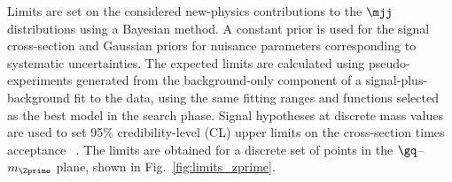Limits are set on the considered new-physics contributions to the $\mjj$ distributions using a Bayesian method. 
A constant prior is used for the signal cross-section and Gaussian priors for nuisance parameters corresponding to systematic uncertainties. 
The expected limits are calculated using pseudo-experiments generated from the background-only component of a signal-plus-background fit to the data, using the same fitting ranges and functions selected as the best model in the search phase.  
Signal hypotheses at discrete mass values are used to set 95\% credibility-level (CL) upper limits on the cross-section times acceptance ~\cite{EXOT-2010-07}.
The limits are obtained for a discrete set of points in the $\gq$--$m_{\Zprime}$ plane, shown in Fig.~\ref{fig:limits_zprime}. 

